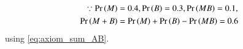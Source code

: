 	\begin{align}
\because\pr{M} &= 0.4, \pr{B} =0.3, \pr{MB} = 0.1,\\
\pr{M+B} &= \pr{M}+\pr{B}-\pr{MB}
	  =0.6
\end{align}
using 
\eqref{eq:axiom_sum_AB}.
